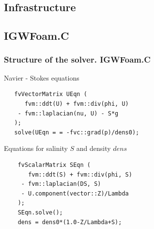 \documentclass[serif,compress, blue, 11pt]{beamer}
\begin{document}
\subsection{Infrastructure}

\subsection{IGWFoam.C}
\begin{frame}[fragile]\frametitle{Structure of the solver. IGWFoam.C}
\begin{block}{Navier - Stokes equations}
\begin{verbatim}
   fvVectorMatrix UEqn (
      fvm::ddt(U) + fvm::div(phi, U)
    - fvm::laplacian(nu, U) - S*g
   );
   solve(UEqn = = -fvc::grad(p)/dens0);
\end{verbatim}
\end{block}

\begin{block}{Equations for salinity $S$ and density $dens$}
\begin{verbatim}
    fvScalarMatrix SEqn (
       fvm::ddt(S) + fvm::div(phi, S)
     - fvm::laplacian(DS, S) 
     - U.component(vector::Z)/Lambda
    );
    SEqn.solve();
    dens = dens0*(1.0-Z/Lambda+S);
\end{verbatim}
\end{block}
\end{frame}
\end{document}
